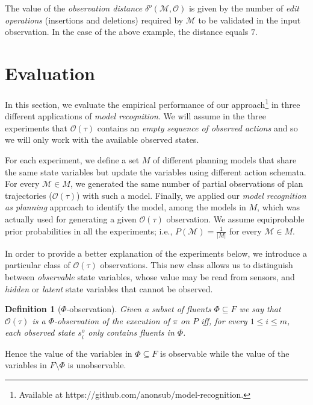 \documentclass[letterpaper]{article} %
\newtheorem{definition}[theorem]{Definition}
\begin{document}
The value of the {\em observation distance} $\delta^o(\mathcal{M},\mathcal{O})$ is given by the number of {\em edit operations} (insertions and deletions) required by $\mathcal{M}$ to be validated in the input observation. In the case of the above example, the distance equals $7$.



\section{Evaluation}
\label{sec:evaluation}

In this section, we evaluate the empirical performance of our approach\footnote{Available at https://github.com/anonsub/model-recognition.} in three different applications of {\em model recognition}. We will assume in the three experiments that $\mathcal{O}(\tau)$ contains an \emph{empty sequence of observed actions} and so we will only work with the available observed states.

For each experiment, we define a set $M$ of different planning models that share the same state variables but update the variables using different action schemata. For every $\mathcal{M}\in M$, we generated the same number of partial observations of plan trajectories ($\mathcal{O}(\tau)$) with such a model. Finally, we applied our {\em model recognition as planning} approach to identify the model, among the models in $M$, which was actually used for generating a given $\mathcal{O}(\tau)$ observation. We assume equiprobable prior probabilities in all the experiments; i.e., $P(\mathcal{M}) = \frac{1}{|M|}$ for every $\mathcal{M} \in M$.

In order to provide a better explanation of the experiments below, we introduce a particular class of $\mathcal{O}(\tau)$ observations. This new class allows us to distinguish between {\em observable} state variables, whose value may be read from sensors, and {\em hidden} or {\em latent} state variables that cannot be observed.

\begin{definition}[$\Phi$-observation]
Given a subset of fluents $\Phi\subseteq F$ we say that $\mathcal{O}(\tau)$ is a $\Phi$-observation of the execution of $\pi$ on $P$ iff, for every ${1\leq i\leq m}$, each observed state $s_i^o$ only contains fluents in $\Phi$.
\end{definition}

Hence the value of the variables in $\Phi\subseteq F$ is observable while the value of the variables in $F\setminus\Phi$ is unobservable.
\end{document}
